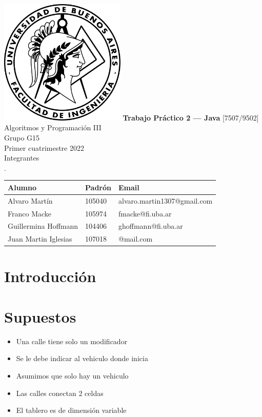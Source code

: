 \documentclass[titlepage,a4paper]{article}
\begin{document}
\begin{titlepage} %
	\hfill\includegraphics[width=6cm]{logofiuba.jpg}
    \centering
    \vfill
    \Huge \textbf{Trabajo Práctico 2 — Java}
    \vskip2cm
    \Large [7507/9502] Algoritmos y Programación III\\
    Grupo G15 \\
    Primer cuatrimestre 2022 \\
    \vfill
    Integrantes \\
    .\\
    \begin{tabular}{ | l | l | l | } %
      \hline
      Alumno & Padrón & Email \\ \hline
      Alvaro Martín & 105040 & alvaro.martin1307@gmail.com \\ \hline
      Franco Macke & 105974 & fmacke@fi.uba.ar \\ \hline
      Guillermina Hoffmann & 104406 & ghoffmann@fi.uba.ar \\ \hline
      Juan Martin Iglesias & 107018 & @mail.com \\ \hline
  	\end{tabular}
    \vfill
    \vfill
\end{titlepage}

\tableofcontents %
\newpage

\section{Introducción}\label{sec:intro}

\section{Supuestos}\label{sec:supuestos}
  \begin{itemize}
    \item Una calle tiene solo un modificador
    \item Se le debe indicar al vehiculo donde inicia
    \item Asumimos que solo hay un vehiculo
    \item Las calles conectan 2 celdas
    \item El tablero es de dimensión variable
  \end{itemize}
\end{document}
